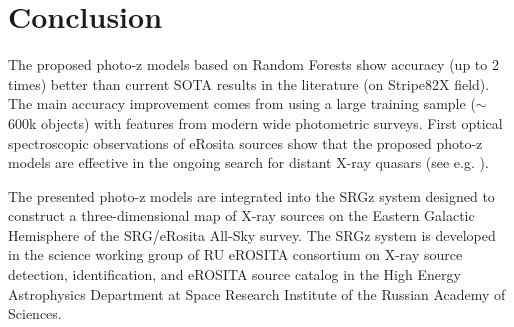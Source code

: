\documentclass[fleqn,usenatbib]{mnras}
\begin{document}
\section{Conclusion}



The proposed photo-z models based on Random Forests show accuracy (up to 2 times) better than current SOTA results in the literature (on Stripe82X field). The main accuracy improvement comes from using a large training sample ($\sim$600k objects) with features from modern wide photometric surveys. First optical spectroscopic observations of eRosita sources show that the proposed photo-z models are effective in the ongoing search for distant X-ray quasars (see e.g. \citep{2020MNRAS.497.1842M,2020AstL...46..149K,2020AstL...46..429D}).

The presented photo-z models are integrated into the SRGz system designed to construct a three-dimensional map of X-ray sources on the Eastern Galactic Hemisphere of the SRG/eRosita All-Sky survey. The SRGz system is developed in the science working group of RU eROSITA consortium on X-ray source detection, identification, and eROSITA source catalog in the High Energy Astrophysics Department at Space Research Institute of the Russian Academy of Sciences.

\end{document}
